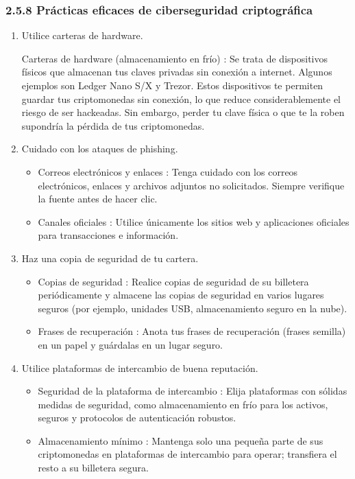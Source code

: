 \documentclass[12pt,a4paper]{article}
\begin{document}
\subsubsection*{2.5.8 Prácticas eficaces de ciberseguridad criptográfica}

\begin{enumerate}[label=\alph*.]
  \item Utilice carteras de hardware.

Carteras de hardware (almacenamiento en frío) : Se trata de dispositivos físicos que almacenan tus claves privadas sin conexión a internet. Algunos ejemplos son Ledger Nano S/X y Trezor. Estos dispositivos te permiten guardar tus criptomonedas sin conexión, lo que reduce considerablemente el riesgo de ser hackeadas. Sin embargo, perder tu clave física o que te la roben supondría la pérdida de tus criptomonedas.

  \item Cuidado con los ataques de phishing.
    \begin{itemize}
      \item Correos electrónicos y enlaces : Tenga cuidado con los correos electrónicos, enlaces y archivos adjuntos no solicitados. Siempre verifique la fuente antes de hacer clic.
      \item Canales oficiales : Utilice únicamente los sitios web y aplicaciones oficiales para transacciones e información.
    \end{itemize}

  \item Haz una copia de seguridad de tu cartera.
    \begin{itemize}
      \item Copias de seguridad : Realice copias de seguridad de su billetera periódicamente y almacene las copias de seguridad en varios lugares seguros (por ejemplo, unidades USB, almacenamiento seguro en la nube).
      \item Frases de recuperación : Anota tus frases de recuperación (frases semilla) en un papel y guárdalas en un lugar seguro.
    \end{itemize}

  \item Utilice plataformas de intercambio de buena reputación.
    \begin{itemize}
      \item Seguridad de la plataforma de intercambio : Elija plataformas con sólidas medidas de seguridad, como almacenamiento en frío para los activos, seguros y protocolos de autenticación robustos.
      \item Almacenamiento mínimo : Mantenga solo una pequeña parte de sus criptomonedas en plataformas de intercambio para operar; transfiera el resto a su billetera segura.
    \end{itemize}
\end{enumerate}
\end{document}
